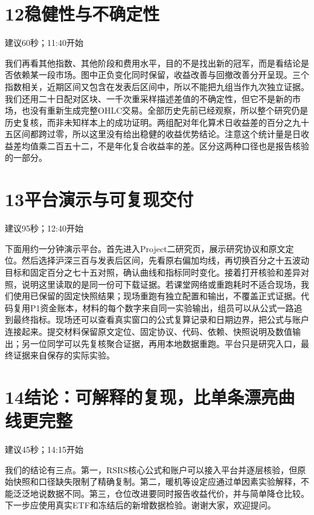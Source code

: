 \documentclass[UTF8,a4paper,11pt]{ctexart}
\begin{document}
\section*{\color{ink}12\quad 稳健性与不确定性}
{\small\color{accent}建议60秒；11:40开始}\par
我们再看其他指数、其他阶段和费用水平，目的不是找出新的冠军，而是看结论是否依赖某一段市场。图中正负变化同时保留，收益改善与回撤改善分开呈现。三个指数相关，近期区间又包含在发表后区间中，所以不能把九组当作九次独立证据。我们还用二十日配对区块、一千次重采样描述差值的不确定性，但它不是新的市场，也没有重新生成完整OHLC交易。全部历史先前已经观察，所以整个研究仍是历史复核，而非未知样本上的成功证明。两组配对年化算术日收益差的百分之九十五区间都跨过零，所以这里没有给出稳健的收益优势结论。注意这个统计量是日收益差均值乘二百五十二，不是年化复合收益率的差。区分这两种口径也是报告核验的一部分。
\newpage
\section*{\color{ink}13\quad 平台演示与可复现交付}
{\small\color{accent}建议95秒；12:40开始}\par
下面用约一分钟演示平台。首先进入Project二研究页，展示研究协议和原文定位。然后选择沪深三百与发表后区间，先看原右偏加均线，再切换百分之十五波动目标和固定百分之七十五对照，确认曲线和指标同时变化。接着打开核验和差异对照，说明这里读取的是同一份可下载证据。若课堂网络或重跑耗时不适合现场，我们使用已保留的固定快照结果；现场重跑有独立配置和输出，不覆盖正式证据。代码复用P1资金账本，材料的每个数字来自同一实验输出，组员可以从公式一路追到最终指标。现场还可以查看真实窗口的公式复算记录和日期边界，把公式与账户连接起来。提交材料保留原文定位、固定协议、代码、依赖、快照说明及数值输出；另一位同学可以先复核聚合证据，再用本地数据重跑。平台只是研究入口，最终证据来自保存的实际实验。
\par{}
\section*{\color{ink}14\quad 结论：可解释的复现，比单条漂亮曲线更完整}
{\small\color{accent}建议45秒；14:15开始}\par
我们的结论有三点。第一，RSRS核心公式和账户可以接入平台并逐层核验，但原始快照和口径缺失限制了精确复制。第二，暖机等设定应通过单因素实验解释，不能泛泛地说数据不同。第三，仓位改进要同时报告收益代价，并与简单降仓比较。下一步应使用真实ETF和冻结后的新增数据检验。谢谢大家，欢迎提问。
\newpage
\end{document}
